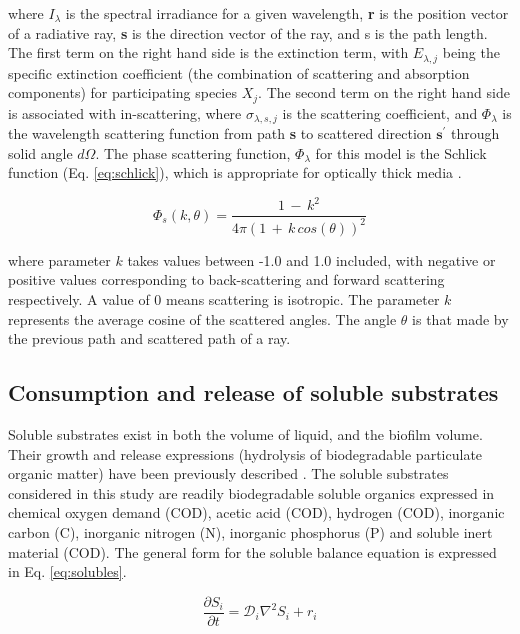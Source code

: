 where $I_\lambda$ is the spectral irradiance for a given wavelength, \textbf{r} is the position vector of a radiative ray, \textbf{s} is the direction vector of the ray, and s is the path length. The first term on the right hand side is the extinction term, with $E_{\lambda, j}$ being the specific extinction coefficient (the combination of scattering and absorption components) for participating species $X_j$. The second term on the right hand side is associated with in-scattering, where $\sigma_{\lambda, s, j}$ is the scattering coefficient, and $\Phi_\lambda$ is the wavelength scattering function from path \textbf{s} to scattered direction $\textbf{s}^\prime$ through solid angle $d\Omega$. The phase scattering function, $\Phi_\lambda$ for this model is the Schlick function (Eq. \ref{eq:schlick}), which is appropriate for optically thick media \cite{jarosz2008}. 

\begin{equation}
\Phi_s(k, \theta) = \frac{1 \, -\,  k^2}{4\pi (1\, +\,k\, cos(\theta))^2 }
\end{equation}

where parameter $k$ takes values between -1.0 and 1.0 included, with negative or positive values corresponding to back-scattering and forward scattering respectively. A value of 0 means scattering is isotropic. The parameter $k$ represents the average cosine of the scattered angles. The angle $\theta$ is that made by the previous path and scattered path of a ray.

\subsection{Consumption and release of soluble substrates}
Soluble substrates exist in both the volume of liquid, and the biofilm volume. Their growth and release expressions (hydrolysis of biodegradable particulate organic matter) have been previously described \cite{puyol2017}. The soluble substrates considered in this study are readily biodegradable soluble organics expressed in chemical oxygen demand (COD), acetic acid (COD), hydrogen (COD), inorganic carbon (C), inorganic nitrogen (N), inorganic phosphorus (P) and soluble inert material (COD). The general form for the soluble balance equation is expressed in Eq. \ref{eq:solubles}.

\begin{equation}
\label{eq:solubles}
\frac{\partial S_i}{\partial t} = \mathcal{D}_i\nabla^2 S_i + r_{i}
\end{equation}

